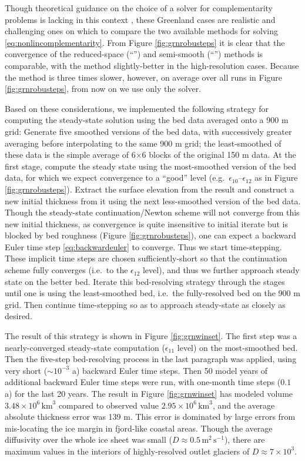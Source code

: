 \documentclass[twocolumn,a4paper]{igs}
\newcommand\eps{\epsilon}
\begin{document}
Though theoretical guidance on the choice of a solver for complementarity problems is lacking in this context \citep[compare][]{BensonMunson2006}, these Greenland cases are realistic and challenging ones on which to compare the two available methods for solving \eqref{eq:nonlincomplementarity}.  From Figure \ref{fig:grnrobusteps} it is clear that the convergence of the reduced-space (``\virs'') and semi-smooth (``\viss'') methods is comparable, with the \virs method slightly-better in the high-resolution cases.  Because the \viss method is three times slower, however, on average over all runs in Figure \ref{fig:grnrobusteps}, from now on we use only the \virs solver.

Based on these considerations, we implemented the following strategy for computing the steady-state solution using the \MCB bed data averaged onto a 900 m grid:  Generate five smoothed versions of the bed data, with successively greater averaging before interpolating to the same 900 m grid; the least-smoothed of these data is the simple average of 6$\times$6 blocks of the original 150 m data.  At the first stage, compute the steady state using the most-smoothed version of the bed data, for which we expect convergence to a ``good'' level (e.g.~$\eps_{10}$--$\eps_{12}$ as in Figure \ref{fig:grnrobusteps}).  Extract the surface elevation from the result and construct a new initial thickness from it using the next less-smoothed version of the bed data.  Though the steady-state continuation/Newton scheme will not converge from this new initial thickness, as convergence is quite insensitive to initial iterate but is blocked by bed roughness (Figure \ref{fig:grnrobusteps}), one can expect a backward Euler time step \eqref{eq:backwardeuler} to converge.  Thus we start time-stepping.  These implicit time steps are chosen sufficiently-short so that the continuation scheme fully converges (i.e.~to the $\eps_{12}$ level), and thus we further approach steady state on the better bed.  Iterate this bed-resolving strategy through the stages until one is using the least-smoothed bed, i.e.~the fully-resolved bed on the 900 m grid.  Then continue time-stepping so as to approach steady-state as closely as desired.

The result of this strategy is shown in Figure \ref{fig:grnwinset}.  The first step was a nearly-converged steady-state computation ($\eps_{11}$ level) on the most-smoothed bed.  Then the five-step bed-resolving process in the last paragraph was applied, using very short ($\sim10^{-3}$ a) backward Euler time steps.  Then 50 model years of additional backward Euler time steps were run, with one-month time steps ($0.1$ a) for the last 20 years.  The result in Figure \ref{fig:grnwinset} has modeled volume $3.48\times 10^6\,\text{km}^3$ compared to observed value $2.95\times 10^6\,\text{km}^3$, and the average absolute thickness error was 139 m.  This error is dominated by large errors from mis-locating the ice margin in fjord-like coastal areas.  Though the average diffusivity over the whole ice sheet was small ($D\approx 0.5\,\text{m}^2\,\text{s}^{-1}$), there are maximum values in the interiors of highly-resolved outlet glaciers of $D\approx 7\times 10^3$.
\end{document}
